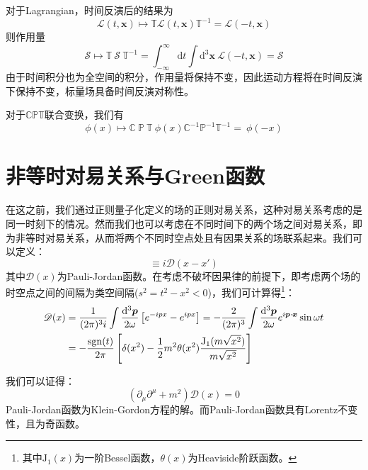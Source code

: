 对于Lagrangian，时间反演后的结果为
\begin{equation}
    \mathscr{L}(t,\boldsymbol{x})\mapsto\mathbb{T}\mathscr{L}(t,\boldsymbol{x})\mathbb{T}^{-1} = \mathscr{L}(-t,\boldsymbol{x})
\end{equation}
则作用量
\begin{equation}
    \mathcal{S}
\mapsto\mathbb{T}~\mathcal{S}~\mathbb{T}^{-1} = \int^{\infty}_{-{\infty}}\mathrm{d}t\int\mathrm{d^3}\boldsymbol{x}~\mathscr{L}(-t,\boldsymbol{x}) = \mathcal{S}
\end{equation}
由于时间积分也为全空间的积分，作用量将保持不变，因此运动方程将在时间反演下保持不变，标量场具备时间反演对称性。

对于$\mathbb{CPT}$联合变换，我们有
\begin{equation}
    \phi(x) \mapsto \mathbb{C}~\mathbb{P}~\mathbb{T}~\phi(x)\mathbb{C}^{-1}\mathbb{P}^{-1}\mathbb{T}^{-1} = ~\phi(-x)
\end{equation}

\section{非等时对易关系与Green函数}
在这之前，我们通过正则量子化定义的场的正则对易关系，这种对易关系考虑的是同一时刻下的情况。然而我们也可以考虑在不同时间下的两个场之间对易关系，即为非等时对易关系，从而将两个不同时空点处且有因果关系的场联系起来。我们可以定义：
\begin{equation}
[\phi(x),\phi(x')]\equiv i\mathscr{D}(x-x')
\end{equation}
其中$\mathscr{D}(x)$为Pauli-Jordan函数。在考虑不破坏因果律的前提下，即考虑两个场的时空点之间的间隔为类空间隔($s^2=t^2-x^2<0$)，我们可计算得\footnote{其中$\mathrm{J}_1(x)$为一阶Bessel函数，$\theta(x)$为Heaviside阶跃函数。 }：
\begin{align}
\mathscr{D}(x)&=\frac{1}{(2\pi)^3i}\int\frac{\mathrm{d}^3\boldsymbol{p}}{2\omega}\left[e^{-ipx}-e^{ipx}\right]	=-\frac{2}{(2\pi)^3}\int\frac{\mathrm{d}^3\boldsymbol{p}}{2\omega}e^{i\boldsymbol{p}\cdot\boldsymbol{x}}\sin\omega t\notag\\
&=-\frac{\mathrm{sgn}(t)}{2\pi}\left[\delta(x^2)-\frac{1}{2}m^2\theta(x^2)\frac{\mathrm{J}_1(m\sqrt{x^2})}{m\sqrt{x^2}}\right]
\label{eqpj}
\end{align}

我们可以证得：
\begin{equation}
(\partial_\mu\partial^\mu+m^2)\mathscr{D}(x)=0
\end{equation}
Pauli-Jordan函数为Klein-Gordon方程的解。而Pauli-Jordan函数具有Lorentz不变性，且为奇函数。

